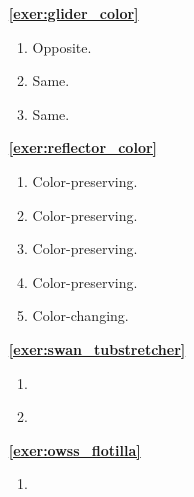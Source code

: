 \begin{multicols}{2}
	\begin{itemize}[leftmargin=0em]
		\item[\bf\color{ocre}\sffamily\ref{exer:glider_color}]
		\begin{enumerate}[leftmargin=1.5em,label=\bf\color{ocre}(\alph*)]
			\item Opposite.
			
			\item Same.
			
			\item Same. \\
		\end{enumerate}
		
		
		\item[\bf\color{ocre}\sffamily\ref{exer:reflector_color}]
		\begin{enumerate}[leftmargin=1.5em,label=(\alph*),series=solu_reflector_color]
			\item Color-preserving.
			
			\item Color-preserving.
			
			\item Color-preserving.
			
			\item Color-preserving.
			
			\item Color-changing. \\
		\end{enumerate}
		
		
		\item[\bf\color{ocre}\sffamily\ref{exer:swan_tubstretcher}]
		\begin{enumerate}[leftmargin=1.5em,label=\bf\color{ocre}(\alph*)]
			\item {}
			
			\item {} \\
		\end{enumerate}
		
		
		\item[\bf\color{ocre}\sffamily\ref{exer:owss_flotilla}]
		\begin{enumerate}[leftmargin=1.5em,label=\bf\color{ocre}(\alph*)]
			\item {}
			

\end{enumerate}
\end{itemize}
\end{multicols}
